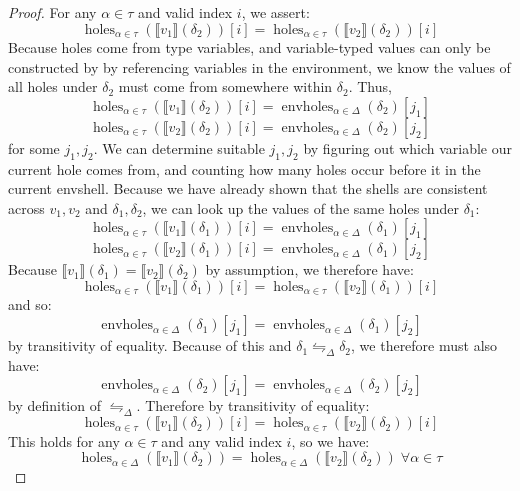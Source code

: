 \documentclass{report}
\theoremstyle{definition}
\newcommand{\den}[1]{\llbracket #1 \rrbracket}
\DeclareMathOperator{\holes}{holes}
\DeclareMathOperator{\envholes}{envholes}
\newcommand{\eqpat}{\leftrightharpoons}
\newcommand{\eqpatD}{\eqpat_{\Delta}}
\begin{document}
\begin{proof}
	For any \(\alpha \in \tau\) and valid index \(i\), we assert:
	\begin{equation}
		\holes_{\alpha \in \tau}(\den{v_1}(\delta_2))[i] = \holes_{\alpha \in \tau}(\den{v_2}(\delta_2))[i]
	\end{equation}
	Because holes come from type variables, and variable-typed values can only be constructed by by referencing variables in the environment,
	we know the values of all holes under \(\delta_2\) must come from somewhere within \(\delta_2\).
	Thus,
	\begin{equation}
		\holes_{\alpha \in \tau}(\den{v_1}(\delta_2))[i] = \envholes_{\alpha \in \Delta}(\delta_2)[j_1] 
	\end{equation}
	\begin{equation}
		\holes_{\alpha \in \tau}(\den{v_2}(\delta_2))[i] = \envholes_{\alpha \in \Delta}(\delta_2)[j_2] 
	\end{equation}
	for some \(j_1, j_2\).
	We can determine suitable \(j_1, j_2\) by figuring out which variable our current hole comes from,
	and counting how many holes occur before it in the current envshell.
	Because we have already shown that the shells are consistent across \(v_1, v_2\) and \(\delta_1, \delta_2\),
	we can look up the values of the same holes under \(\delta_1\):
	\begin{equation}
		\holes_{\alpha \in \tau}(\den{v_1}(\delta_1))[i] = \envholes_{\alpha \in \Delta}(\delta_1)[j_1] 
	\end{equation}
	\begin{equation}
		\holes_{\alpha \in \tau}(\den{v_2}(\delta_1))[i] = \envholes_{\alpha \in \Delta}(\delta_1)[j_2] 
	\end{equation}
	Because \(\den{v_1}(\delta_1) = \den{v_2}(\delta_2)\) by assumption, we therefore have:
	\begin{equation}
		\holes_{\alpha \in \tau}(\den{v_1}(\delta_1))[i] = \holes_{\alpha \in \tau}(\den{v_2}(\delta_1))[i] 
	\end{equation}
	and so:
	\begin{equation}
		\envholes_{\alpha \in \Delta}(\delta_1)[j_1] = \envholes_{\alpha \in \Delta}(\delta_1)[j_2] 
	\end{equation}
	by transitivity of equality.
	Because of this and \(\delta_1 \eqpatD \delta_2\), we therefore must also have:
	\begin{equation}
		\envholes_{\alpha \in \Delta}(\delta_2)[j_1] = \envholes_{\alpha \in \Delta}(\delta_2)[j_2] 
	\end{equation}
	by definition of \(\eqpatD\).
	Therefore by transitivity of equality:
	\begin{equation}
		\holes_{\alpha \in \tau}(\den{v_1}(\delta_2))[i] = \holes_{\alpha \in \tau}(\den{v_2}(\delta_2))[i] 
	\end{equation}
	This holds for any \(\alpha \in \tau\) and any valid index \(i\), so we have:
	\begin{equation}
		\holes_{\alpha \in \Delta}(\den{v_1}(\delta_2)) = \holes_{\alpha \in \Delta}(\den{v_2}(\delta_2)) \; \forall \alpha \in \tau
	\end{equation}


\end{proof}
\end{document}
